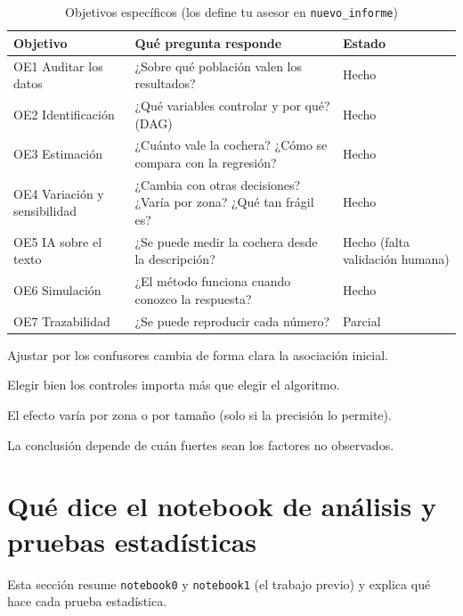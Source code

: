 \documentclass[11pt,a4paper]{article}
\begin{document}
\begin{table}[H]\small
\caption{Objetivos específicos (los define tu asesor en \texttt{nuevo\_informe})}
\begin{tabularx}{\textwidth}{lLl}
\toprule
Objetivo & Qué pregunta responde & Estado \\
\midrule
OE1 Auditar los datos & ¿Sobre qué población valen los resultados? & Hecho \\
OE2 Identificación & ¿Qué variables controlar y por qué? (DAG) & Hecho \\
OE3 Estimación & ¿Cuánto vale la cochera? ¿Cómo se compara con la regresión? & Hecho \\
OE4 Variación y sensibilidad & ¿Cambia con otras decisiones? ¿Varía por zona? ¿Qué tan frágil es? & Hecho \\
OE5 IA sobre el texto & ¿Se puede medir la cochera desde la descripción? & Hecho (falta validación humana) \\
OE6 Simulación & ¿El método funciona cuando conozco la respuesta? & Hecho \\
OE7 Trazabilidad & ¿Se puede reproducir cada número? & Parcial \\
\bottomrule
\end{tabularx}
\end{table}

\begin{description}[leftmargin=1cm]
\item[H1] Ajustar por los confusores cambia de forma clara la asociación inicial.
\item[H2] Elegir bien los controles importa más que elegir el algoritmo.
\item[H3] El efecto varía por zona o por tamaño (solo si la precisión lo permite).
\item[H4] La conclusión depende de cuán fuertes sean los factores no observados.
\end{description}


\section{Qué dice el notebook de análisis y pruebas estadísticas}

Esta sección resume \texttt{notebook0} y \texttt{notebook1} (el trabajo previo) y explica qué hace cada prueba estadística.
\end{document}

